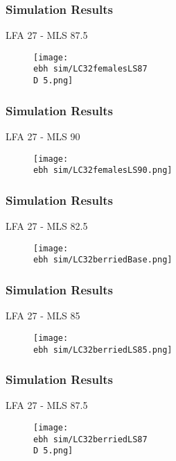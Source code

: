 \documentclass{beamer}
\newcommand{\ebh}{\string~/bio.data/bio.lobster/figures/LFA2733Framework2018/} %
\newcommand{\D}{.}
\begin{document}
\begin{frame}
\frametitle{Simulation Results}
LFA 27 - MLS 87.5
\begin{figure}
        \begin{center}
            \texttt{[image: \\ebh sim/LC32femalesLS87\\D 5.png]}
        \end{center}
    \end{figure}
\end{frame}


\begin{frame}
\frametitle{Simulation Results}
LFA 27 - MLS 90
\begin{figure}
        \begin{center}
            \texttt{[image: \\ebh sim/LC32femalesLS90.png]}
        \end{center}
    \end{figure}
\end{frame}




\begin{frame}
\frametitle{Simulation Results}
LFA 27 - MLS 82.5
\begin{figure}
        \begin{center}
            \texttt{[image: \\ebh sim/LC32berriedBase.png]}
        \end{center}
    \end{figure}
\end{frame}



\begin{frame}
\frametitle{Simulation Results}
LFA 27 - MLS 85
\begin{figure}
        \begin{center}
            \texttt{[image: \\ebh sim/LC32berriedLS85.png]}
        \end{center}
    \end{figure}
\end{frame}


\begin{frame}
\frametitle{Simulation Results}
LFA 27 - MLS 87.5
\begin{figure}
        \begin{center}
            \texttt{[image: \\ebh sim/LC32berriedLS87\\D 5.png]}
        \end{center}
    \end{figure}
\end{frame}
\end{document}
